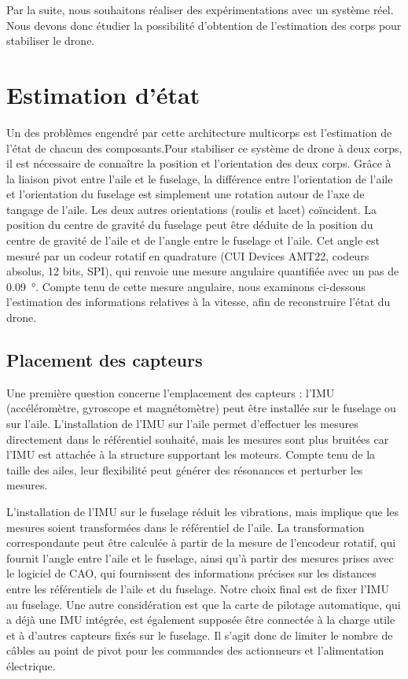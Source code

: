 Par la suite, nous souhaitons réaliser des expérimentations avec un système réel. Nous devons donc étudier la possibilité d'obtention de l'estimation des corps pour stabiliser le drone.







\section{Estimation d'état}\label{sec:stateEst}

Un des problèmes engendré par cette architecture multicorps est l'estimation de l'état de chacun des composants.Pour stabiliser ce système de drone à deux corps, il est nécessaire de connaître la position et l'orientation des deux corps. Grâce à la liaison pivot entre l'aile et le fuselage, la différence entre l'orientation de l'aile et l'orientation du fuselage est simplement une rotation autour de l'axe de tangage de l'aile. Les deux autres orientations (roulis et lacet) coïncident. La position du centre de gravité du fuselage peut être déduite de la position du centre de gravité de l'aile et de l'angle entre le fuselage et l'aile. Cet angle est mesuré par un codeur rotatif en quadrature (CUI Devices AMT22, codeurs absolus, 12 bits, SPI), qui renvoie une mesure angulaire quantifiée avec un pas de \SI{0,09}{\degree}. Compte tenu de cette mesure angulaire, nous examinons ci-dessous l'estimation des informations relatives à la vitesse, afin de reconstruire l'état du drone.

\subsection{Placement des capteurs}
\label{subsec:sens_pos}
Une première question concerne l'emplacement des capteurs : l'IMU (accéléromètre, gyroscope et magnétomètre) peut être installée sur le fuselage ou sur l'aile. 
L'installation de l'IMU sur l'aile permet d'effectuer les mesures directement dans le référentiel souhaité, mais les mesures sont plus bruitées car l'IMU est attachée à la structure supportant les moteurs. Compte tenu de la taille des ailes, leur flexibilité peut générer des résonances et perturber les mesures. 

L'installation de l'IMU sur le fuselage réduit les vibrations, mais implique que les mesures soient transformées dans le référentiel de l'aile. La transformation correspondante peut être calculée à partir de la mesure de l'encodeur rotatif, qui fournit l'angle entre l'aile et le fuselage, ainsi qu'à partir des mesures prises avec le logiciel de CAO, qui fournissent des informations précises sur les distances entre les référentiels de l'aile et du fuselage. Notre choix final est de fixer l'IMU au fuselage. Une autre considération est que la carte de pilotage automatique, qui a déjà une IMU intégrée, est également supposée être connectée à la charge utile et à d'autres capteurs fixés sur le fuselage. Il s'agit donc de limiter le nombre de câbles au point de pivot pour les commandes des actionneurs et l'alimentation électrique.

